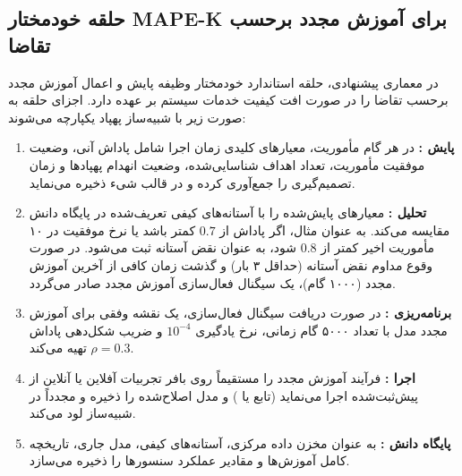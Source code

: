 \documentclass[oneside,openany,a4paper,12pt]{article}
\begin{document}
\subsection{حلقه خودمختار MAPE-K برای آموزش مجدد برحسب تقاضا}
در معماری پیشنهادی، حلقه استاندارد خودمختار  وظیفه پایش و اعمال آموزش مجدد برحسب تقاضا  را در صورت افت کیفیت خدمات سیستم بر عهده دارد. اجزای حلقه به صورت زیر با شبیه‌ساز پهپاد یکپارچه می‌شوند:
\begin{enumerate}
    \item \textbf{پایش :} در هر گام مأموریت، معیارهای کلیدی زمان اجرا شامل پاداش آنی، وضعیت موفقیت مأموریت، تعداد اهداف شناسایی‌شده، وضعیت انهدام پهپادها و زمان تصمیم‌گیری را جمع‌آوری کرده و در قالب شیء  ذخیره می‌نماید.
    \item \textbf{تحلیل :} معیارهای پایش‌شده را با آستانه‌های کیفی تعریف‌شده در پایگاه دانش مقایسه می‌کند. به عنوان مثال، اگر پاداش از $0.7$ کمتر باشد یا نرخ موفقیت در ۱۰ مأموریت اخیر کمتر از $0.8$ شود، به عنوان نقض آستانه ثبت می‌شود. در صورت وقوع مداوم نقض آستانه (حداقل ۳ بار) و گذشت زمان کافی از آخرین آموزش مجدد (۱۰۰۰ گام)، یک سیگنال فعال‌سازی آموزش مجدد صادر می‌گردد.
    \item \textbf{برنامه‌ریزی :} در صورت دریافت سیگنال فعال‌سازی، یک نقشه وفقی  برای آموزش مجدد مدل با تعداد ۵۰۰۰ گام زمانی، نرخ یادگیری $10^{-4}$ و ضریب شکل‌دهی پاداش $\rho = 0.3$ تهیه می‌کند.
    \item \textbf{اجرا :} فرآیند آموزش مجدد را مستقیماً روی بافر تجربیات آفلاین یا آنلاین از پیش‌ثبت‌شده اجرا می‌نماید (تابع  یا ) و مدل اصلاح‌شده را ذخیره و مجدداً در شبیه‌ساز لود می‌کند.
    \item \textbf{پایگاه دانش :} به عنوان مخزن داده مرکزی، آستانه‌های کیفی، مدل جاری، تاریخچه کامل آموزش‌ها و مقادیر عملکرد سنسورها را ذخیره می‌سازد.
\end{enumerate}
\end{document}
